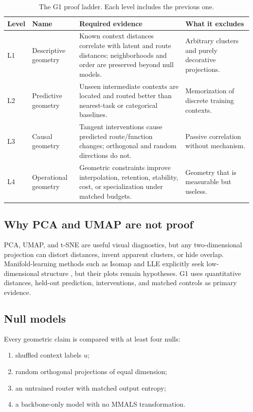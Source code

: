 \documentclass[11pt,a4paper]{article}
\begin{document}
\begin{table}[H]
\centering
\caption{The G1 proof ladder. Each level includes the previous one.}
\label{tab:proof}
\begin{tabularx}{\textwidth}{@{}p{1.2cm}p{3.2cm}Y Y@{}}
\toprule
\textbf{Level} & \textbf{Name} & \textbf{Required evidence} & \textbf{What it excludes} \\
\midrule
L1 & Descriptive geometry & Known context distances correlate with latent and route distances; neighborhoods and order are preserved beyond null models. & Arbitrary clusters and purely decorative projections. \\
L2 & Predictive geometry & Unseen intermediate contexts are located and routed better than nearest-task or categorical baselines. & Memorization of discrete training contexts. \\
L3 & Causal geometry & Tangent interventions cause predicted route/function changes; orthogonal and random directions do not. & Passive correlation without mechanism. \\
L4 & Operational geometry & Geometric constraints improve interpolation, retention, stability, cost, or specialization under matched budgets. & Geometry that is measurable but useless. \\
\bottomrule
\end{tabularx}
\end{table}

\subsection{Why PCA and UMAP are not proof}

PCA, UMAP, and t-SNE are useful visual diagnostics, but any two-dimensional projection can distort distances, invent apparent clusters, or hide overlap. Manifold-learning methods such as Isomap and LLE explicitly seek low-dimensional structure \citep{tenenbaum2000isomap,roweis2000lle}, but their plots remain hypotheses. G1 uses quantitative distances, held-out prediction, interventions, and matched controls as primary evidence.

\subsection{Null models}

Every geometric claim is compared with at least four nulls:

\begin{enumerate}
\item shuffled context labels \(u\);
\item random orthogonal projections of equal dimension;
\item an untrained router with matched output entropy;
\item a backbone-only model with no MMALS transformation.
\end{enumerate}
\end{document}
